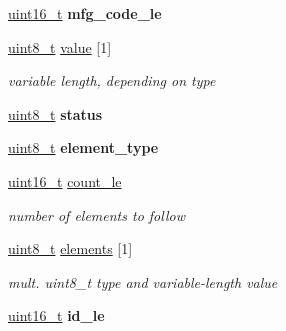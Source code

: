 \begin{DoxyCompactItemize}
\item 
\hypertarget{group__zcl_gaf5ecfc107b4958e60701a824b3059bcb}{\hyperlink{group__hal_ga5a8b2dc9e45a9ee81a94ef304fb62505}{uint16\-\_\-t} {\bfseries mfg\-\_\-code\-\_\-le}}\label{group__zcl_gaf5ecfc107b4958e60701a824b3059bcb}

\item 
\hyperlink{group__hal_gae1affc9ca37cfb624959c866a73f83c2}{uint8\-\_\-t} \hyperlink{group__zcl_ga1ed5b151a90f7e99af8cca2e6875ddf4}{value} \mbox{[}1\mbox{]}
\begin{DoxyCompactList}\small\item\em variable length, depending on type \end{DoxyCompactList}\item 
\hypertarget{group__zcl_gade818037fd6c985038ff29656089758d}{\hyperlink{group__hal_gae1affc9ca37cfb624959c866a73f83c2}{uint8\-\_\-t} {\bfseries status}}\label{group__zcl_gade818037fd6c985038ff29656089758d}

\item 
\hypertarget{group__zcl_ga550de1d9594d987e5f7bf5482c36bb43}{\hyperlink{group__hal_gae1affc9ca37cfb624959c866a73f83c2}{uint8\-\_\-t} {\bfseries element\-\_\-type}}\label{group__zcl_ga550de1d9594d987e5f7bf5482c36bb43}

\item 
\hypertarget{group__zcl_gaf097182653bc185e0b103ae4a751e320}{\hyperlink{group__hal_ga5a8b2dc9e45a9ee81a94ef304fb62505}{uint16\-\_\-t} \hyperlink{group__zcl_gaf097182653bc185e0b103ae4a751e320}{count\-\_\-le}}\label{group__zcl_gaf097182653bc185e0b103ae4a751e320}

\begin{DoxyCompactList}\small\item\em number of elements to follow \end{DoxyCompactList}\item 
\hypertarget{group__zcl_ga41182853b4ed09884567019cecdf9358}{\hyperlink{group__hal_gae1affc9ca37cfb624959c866a73f83c2}{uint8\-\_\-t} \hyperlink{group__zcl_ga41182853b4ed09884567019cecdf9358}{elements} \mbox{[}1\mbox{]}}\label{group__zcl_ga41182853b4ed09884567019cecdf9358}

\begin{DoxyCompactList}\small\item\em mult. uint8\-\_\-t type and variable-\/length value \end{DoxyCompactList}\item 
\hypertarget{group__zcl_ga5362d5f34924d89ad47bf654355894eb}{\hyperlink{group__hal_ga5a8b2dc9e45a9ee81a94ef304fb62505}{uint16\-\_\-t} {\bfseries id\-\_\-le}}\label{group__zcl_ga5362d5f34924d89ad47bf654355894eb}


\end{DoxyCompactItemize}
